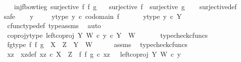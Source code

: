 \begin{isabellebody}
\ \ \ inj{\isacharunderscore}{\kern0pt}f{\isacharunderscore}{\kern0pt}bowtie{\isacharunderscore}{\kern0pt}g{\isacharcolon}{\kern0pt}\ {\isachardoublequoteopen}surjective\ {\isacharparenleft}{\kern0pt}f\ {\isasymbowtie}\isactrlsub f\ g{\isacharparenright}{\kern0pt}{\isachardoublequoteclose}\isanewline
\ \ \ {\isachardoublequoteopen}surjective\ f\ {\isasymand}\ surjective\ g{\isachardoublequoteclose}\isanewline
%
\isadelimproof
\ \ %
\endisadelimproof
%
\isatagproof
{}\isamarkupfalse%
\ surjective{\isacharunderscore}{\kern0pt}def\isanewline
{}\isamarkupfalse%
{\isacharparenleft}{\kern0pt}safe{\isacharparenright}{\kern0pt}\isanewline
\ \ \isamarkupfalse%
\ y\ \isanewline
\ \ \isamarkupfalse%
\ y{\isacharunderscore}{\kern0pt}type{\isacharcolon}{\kern0pt}\ {\isachardoublequoteopen}y\ {\isasymin}\isactrlsub c\ codomain\ f{\isachardoublequoteclose}\ \isanewline
\ \ \isamarkupfalse%
\ \isamarkupfalse%
\ y{\isacharunderscore}{\kern0pt}type{}{\isacharcolon}{\kern0pt}\ {\isachardoublequoteopen}y\ {\isasymin}\isactrlsub c\ Y{\isachardoublequoteclose}\isanewline
\ \ \ \ \isamarkupfalse%
\ cfunc{\isacharunderscore}{\kern0pt}type{\isacharunderscore}{\kern0pt}def\ type{\isacharunderscore}{\kern0pt}assms{\isacharparenleft}{\kern0pt}{}{\isacharparenright}{\kern0pt}\ \isamarkupfalse%
\ auto\isanewline
\ \ \isamarkupfalse%
\ \isamarkupfalse%
\ coproj{\isacharunderscore}{\kern0pt}y{\isacharunderscore}{\kern0pt}type{\isacharcolon}{\kern0pt}\ {\isachardoublequoteopen}left{\isacharunderscore}{\kern0pt}coproj\ Y\ W\ {\isasymcirc}\isactrlsub c\ y\ {\isasymin}\isactrlsub c\ Y\ {\isasymCoprod}\ W{\isachardoublequoteclose}\ \isanewline
\ \ \ \ \isamarkupfalse%
\ typecheck{\isacharunderscore}{\kern0pt}cfuncs\isanewline
\ \ \isamarkupfalse%
\ fg{\isacharunderscore}{\kern0pt}type{\isacharcolon}{\kern0pt}\ {\isachardoublequoteopen}{\isacharparenleft}{\kern0pt}f\ {\isasymbowtie}\isactrlsub f\ g{\isacharparenright}{\kern0pt}\ {\isacharcolon}{\kern0pt}\ X\ {\isasymCoprod}\ Z\ {\isasymrightarrow}\ Y\ {\isasymCoprod}\ W{\isachardoublequoteclose}\isanewline
\ \ \ \ \isamarkupfalse%
\ assms\ \isamarkupfalse%
\ typecheck{\isacharunderscore}{\kern0pt}cfuncs\isanewline
\ \ \isamarkupfalse%
\ xz\ \ xz{\isacharunderscore}{\kern0pt}def{\isacharcolon}{\kern0pt}\ {\isachardoublequoteopen}xz\ {\isasymin}\isactrlsub c\ X\ {\isasymCoprod}\ Z\ {\isasymand}\ {\isacharparenleft}{\kern0pt}f\ {\isasymbowtie}\isactrlsub f\ g{\isacharparenright}{\kern0pt}\ {\isasymcirc}\isactrlsub c\ xz\ {\isacharequal}{\kern0pt}\ \ left{\isacharunderscore}{\kern0pt}coproj\ Y\ W\ {\isasymcirc}\isactrlsub c\ y{\isachardoublequoteclose}\isanewline

\end{isabellebody}
